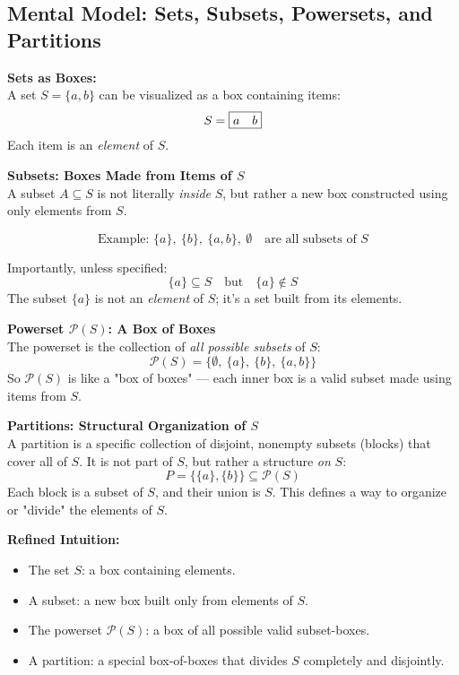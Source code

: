 \documentclass[10pt]{article}
\theoremstyle{plain}
\theoremstyle{definition}
\begin{document}
	\subsection*{Mental Model: Sets, Subsets, Powersets, and Partitions}
	
	\textbf{Sets as Boxes:} \\
	A set \( S = \{a, b\} \) can be visualized as a box containing items:
	\[
	S = \fbox{\( a \quad b \)}
	\]
	Each item is an \emph{element} of \( S \).
	
	\vspace{1em}
	\textbf{Subsets: Boxes Made from Items of \( S \)} \\
	A subset \( A \subseteq S \) is not literally \emph{inside} \( S \), but rather a new box constructed using only elements from \( S \).
	
	\[
	\text{Example: } \{a\},\ \{b\},\ \{a, b\},\ \emptyset \quad \text{are all subsets of } S
	\]
	
	Importantly, unless specified:
	\[
	\{a\} \subseteq S \quad \text{but} \quad \{a\} \notin S
	\]
	The subset \( \{a\} \) is not an \emph{element} of \( S \); it's a set built from its elements.
	
	\vspace{1em}
	\textbf{Powerset \( \mathcal{P}(S) \): A Box of Boxes} \\
	The powerset is the collection of \emph{all possible subsets} of \( S \):
	\[
	\mathcal{P}(S) = \{ \emptyset,\ \{a\},\ \{b\},\ \{a, b\} \}
	\]
	So \( \mathcal{P}(S) \) is like a "box of boxes" — each inner box is a valid subset made using items from \( S \).
	
	\vspace{1em}
	\textbf{Partitions: Structural Organization of \( S \)} \\
	A partition is a specific collection of disjoint, nonempty subsets (blocks) that cover all of \( S \). It is not part of \( S \), but rather a structure \emph{on} \( S \):
	\[
	P = \{ \{a\}, \{b\} \} \subseteq \mathcal{P}(S)
	\]
	Each block is a subset of \( S \), and their union is \( S \). This defines a way to organize or "divide" the elements of \( S \).
	
	\vspace{1em}
	\textbf{Refined Intuition:}
	\begin{itemize}
		\item The set \( S \): a box containing elements.
		\item A subset: a new box built only from elements of \( S \).
		\item The powerset \( \mathcal{P}(S) \): a box of all possible valid subset-boxes.
		\item A partition: a special box-of-boxes that divides \( S \) completely and disjointly.
	\end{itemize}
	
\end{document}

